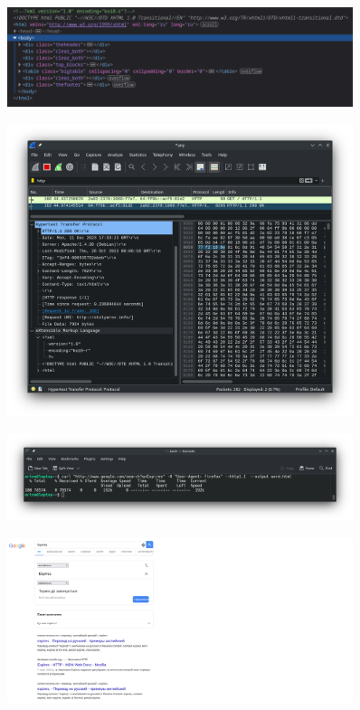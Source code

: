 \documentclass[12pt]{extarticle}
\begin{document}
\begin{figure}[H]
    \centering
    \includegraphics[width=0.90\textwidth]{firefox}
    \caption{}
\end{figure}

\begin{figure}[H]
    \centering
    \includegraphics[width=0.90\textwidth]{wireshark}
    \caption{}
\end{figure}

\begin{figure}[H]
    \centering
    \includegraphics[width=0.90\textwidth]{curl_expires}
    \caption{}
\end{figure}

\begin{figure}[H]
    \centering
    \includegraphics[width=0.90\textwidth]{expires}
    \caption{}
\end{figure}
\end{document}
